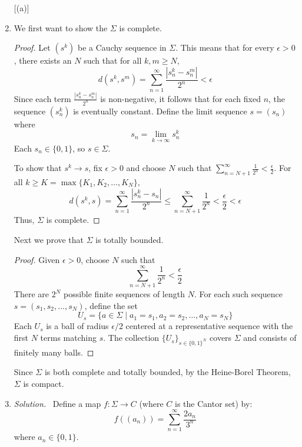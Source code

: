 \documentclass[12pt]{article}
\renewcommand{\_}[1]{\underline{ #1 }}
\theoremstyle{definition}
\newenvironment{exercise}[1]
  {\renewcommand\theinnercustomthm{#1}\innercustomthm}
  {\endinnercustomthm}
\newenvironment{solution}{\par\noindent\textit{Solution.}\ }{\par}
\numberwithin{equation}{subsection}
\begin{document}
\begin{exercise}{101}
    \begin{enumerate} [(a)]
        \item We first want to show the $\Sigma$ is complete. \begin{proof}
Let \((s^k)\) be a Cauchy sequence in \(\Sigma\). This means that for every \(\epsilon > 0\), there exists an \(N\) such that for all \(k, m \geq N\),
\[
d(s^k, s^m) = \sum_{n=1}^\infty \frac{|s^k_n - s^m_n|}{2^n} < \epsilon
\]
Since each term \(\frac{|s^k_n - s^m_n|}{2^n}\) is non-negative, it follows that for each fixed \(n\), the sequence \((s^k_n)\) is eventually constant. Define the limit sequence \(s = (s_n)\) where
\[
s_n = \lim_{k \to \infty} s^k_n
\]
Each \(s_n \in \{0,1\}\), so \(s \in \Sigma\).

To show that \(s^k \to s\), fix \(\epsilon > 0\) and choose \(N\) such that \(\sum_{n=N+1}^\infty \frac{1}{2^n} < \frac{\epsilon}{2}\). For all \(k \geq K = \max\{K_1, K_2, \dots, K_N\}\),
\[
d(s^k, s) = \sum_{n=1}^\infty \frac{|s^k_n - s_n|}{2^n} \leq \sum_{n=N+1}^\infty \frac{1}{2^n} < \frac{\epsilon}{2} < \epsilon
\]
Thus, \(\Sigma\) is complete.
\end{proof}
Next we prove that $\Sigma$ is totally bounded. \begin{proof}
Given \(\epsilon > 0\), choose \(N\) such that
\[
\sum_{n=N+1}^\infty \frac{1}{2^n} < \frac{\epsilon}{2}
\]
There are \(2^N\) possible finite sequences of length \(N\). For each such sequence \(s = (s_1, s_2, \dots, s_N)\), define the set
\[
U_s = \{ a \in \Sigma \mid a_1 = s_1, a_2 = s_2, \dots, a_N = s_N \}
\]
Each \(U_s\) is a ball of radius \(\epsilon/2\) centered at a representative sequence with the first \(N\) terms matching \(s\). The collection \(\{U_s\}_{s \in \{0,1\}^N}\) covers \(\Sigma\) and consists of finitely many balls.
\end{proof}
Since \(\Sigma\) is both complete and totally bounded, by the Heine-Borel Theorem, \(\Sigma\) is compact.
\item \begin{solution}
    Define a map \(f: \Sigma \to C\) (where \(C\) is the Cantor set) by:
\[
f((a_n)) = \sum_{n=1}^\infty \frac{2a_n}{3^n}
\]
where \(a_n \in \{0,1\}\).


\end{solution}
\end{enumerate}
\end{exercise}
\end{document}
